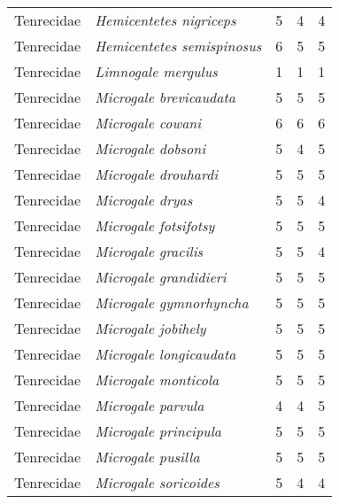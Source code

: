 \begin{tabular}[t]{l l c c c}
Tenrecidae & \textit{Hemicentetes nigriceps} & 5 & 4 & 4\\
Tenrecidae & \textit{Hemicentetes semispinosus} & 6 & 5 & 5 \\
Tenrecidae & \textit{Limnogale mergulus} & 1 & 1 & 1\\
Tenrecidae & \textit{Microgale brevicaudata} & 5 & 5 & 5 \\
Tenrecidae & \textit{Microgale cowani} & 6 & 6 & 6\\
Tenrecidae & \textit{Microgale dobsoni} & 5 & 4 & 5\\
Tenrecidae & \textit{Microgale drouhardi} & 5 & 5 & 5 \\
Tenrecidae & \textit{Microgale dryas} & 5 & 5 & 4\\
Tenrecidae & \textit{Microgale fotsifotsy} & 5 & 5 & 5 \\
Tenrecidae & \textit{Microgale gracilis} & 5 & 5 & 4\\
Tenrecidae & \textit{Microgale grandidieri} & 5 & 5 & 5\\
Tenrecidae & \textit{Microgale gymnorhyncha} & 5 & 5 & 5 \\
Tenrecidae & \textit{Microgale jobihely} & 5 & 5 & 5\\
Tenrecidae & \textit{Microgale longicaudata} & 5 & 5 & 5 \\
Tenrecidae & \textit{Microgale monticola} & 5 & 5 & 5 \\
Tenrecidae & \textit{Microgale parvula} & 4 & 4 & 5\\
Tenrecidae & \textit{Microgale principula} & 5 & 5 & 5\\
Tenrecidae & \textit{Microgale pusilla} & 5 & 5 & 5\\
Tenrecidae & \textit{Microgale soricoides} & 5 & 4 & 4\\

\end{tabular}
